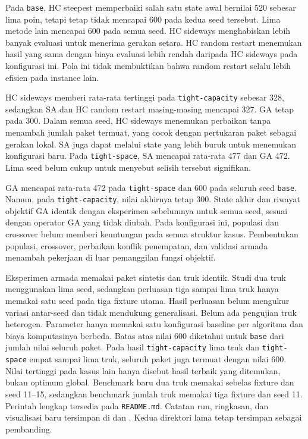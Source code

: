 Pada \texttt{base}, HC steepest memperbaiki salah satu state awal bernilai 520 sebesar lima poin, tetapi tetap tidak mencapai 600 pada kedua seed tersebut. Lima metode lain mencapai 600 pada semua seed. HC sideways menghabiskan lebih banyak evaluasi untuk menerima gerakan setara. HC random restart menemukan hasil yang sama dengan biaya evaluasi lebih rendah daripada HC sideways pada konfigurasi ini. Pola ini tidak membuktikan bahwa random restart selalu lebih efisien pada instance lain.

HC sideways memberi rata-rata tertinggi pada \texttt{tight-capacity} sebesar 328, sedangkan SA dan HC random restart masing-masing mencapai 327. GA tetap pada 300. Dalam semua seed, HC sideways menemukan perbaikan tanpa menambah jumlah paket termuat, yang cocok dengan pertukaran paket sebagai gerakan lokal. SA juga dapat melalui state yang lebih buruk untuk menemukan konfigurasi baru. Pada \texttt{tight-space}, SA mencapai rata-rata 477 dan GA 472. Lima seed belum cukup untuk menyebut selisih tersebut signifikan.

GA mencapai rata-rata 472 pada \texttt{tight-space} dan 600 pada seluruh seed \texttt{base}. Namun, pada \texttt{tight-capacity}, nilai akhirnya tetap 300. State akhir dan riwayat objektif GA identik dengan eksperimen sebelumnya untuk semua seed, sesuai dengan operator GA yang tidak diubah. Pada konfigurasi ini, populasi dan crossover belum memberi keuntungan pada semua struktur kasus. Pembentukan populasi, crossover, perbaikan konflik penempatan, dan validasi armada menambah pekerjaan di luar pemanggilan fungsi objektif.

Eksperimen armada memakai paket sintetis dan truk identik. Studi dua truk menggunakan lima seed, sedangkan perluasan tiga sampai lima truk hanya memakai satu seed pada tiga fixture utama. Hasil perluasan belum mengukur variasi antar-seed dan tidak mendukung generalisasi. Belum ada pengujian truk heterogen. Parameter hanya memakai satu konfigurasi baseline per algoritma dan biaya komputasinya berbeda. Batas atas nilai 600 diketahui untuk \texttt{base} dari jumlah nilai seluruh paket. Pada hasil \texttt{tight-capacity} lima truk dan \texttt{tight-space} empat sampai lima truk, seluruh paket juga termuat dengan nilai 600. Nilai tertinggi pada kasus lain hanya disebut hasil terbaik yang ditemukan, bukan optimum global. Benchmark baru dua truk memakai sebelas fixture dan seed 11--15, sedangkan benchmark jumlah truk memakai tiga fixture dan seed 11. Perintah lengkap tersedia pada \texttt{README.md}. Catatan run, ringkasan, dan visualisasi baru tersimpan di  dan . Kedua direktori lama tetap tersimpan sebagai pembanding.

